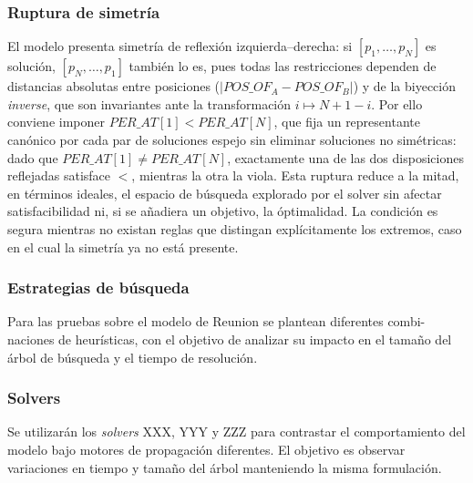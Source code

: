\subsubsection*{Ruptura de simetría}
El modelo presenta simetría de reflexión izquierda–derecha: si \([p_1,\dots,p_N]\) es solución, \([p_N,\dots,p_1]\) también lo es, pues todas las restricciones dependen de distancias absolutas entre posiciones (\(|POS\_OF_A-POS\_OF_B|\)) y de la biyección \textit{inverse}, que son invariantes ante la transformación \(i\mapsto N{+}1{-}i\). Por ello conviene imponer \(PER\_AT[1]<PER\_AT[N]\), que fija un representante canónico por cada par de soluciones espejo sin eliminar soluciones no simétricas: dado que \(PER\_AT[1]\neq PER\_AT[N]\), exactamente una de las dos disposiciones reflejadas satisface \(<\), mientras la otra la viola. Esta ruptura reduce a la mitad, en términos ideales, el espacio de búsqueda explorado por el solver sin afectar satisfacibilidad ni, si se añadiera un objetivo, la óptimalidad. La condición es segura mientras no existan reglas que distingan explícitamente los extremos, caso en el cual la simetría ya no está presente.

\subsubsection*{Estrategias de búsqueda}
Para las pruebas sobre el modelo de Reunion se plantean diferentes combi-
naciones de heurísticas, con el objetivo de analizar su impacto en el tamaño
del árbol de búsqueda y el tiempo de resolución.

\subsubsection*{Solvers}
Se utilizarán los \emph{solvers} XXX, YYY y ZZZ para contrastar el comportamiento del modelo bajo motores de propagación diferentes. El objetivo es observar variaciones en tiempo y tamaño del árbol manteniendo la misma formulación.